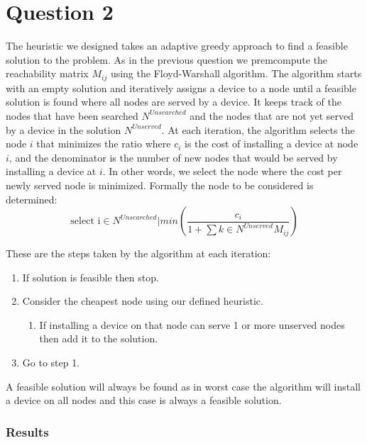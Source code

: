 \section{Question 2}

The heuristic we designed takes an adaptive greedy approach to find a feasible solution to the problem.
As in the previous question we premcompute the reachability matrix $M_{ij}$ using the Floyd-Warshall algorithm.
The algorithm starts with an empty solution and iteratively assigns a device to a node until a feasible solution is found where all nodes are served by a device.
It keeps track of the nodes that have been searched $N^{Unsearched}$ and the nodes that are not yet served by a device in the solution $N^{Unserved}$.
At each iteration, the algorithm selects the node $i$ that minimizes the ratio
where $c_i$ is the cost of installing a device at node $i$, and the denominator is the number of new nodes that would be served by installing a device at $i$. In other words, we select the node where the cost per newly served node is minimized.
Formally the node to be considered is determined: 
$$\text{select i} \in N^{Unsearched} | min(\frac{c_i}{1 + \sum{k \in N^{Unserved}}^{} M_{ij}})$$

These are the steps taken by the algorithm at each iteration:
\begin{enumerate}
	\item If solution is feasible then stop.
	\item Consider the cheapest node using our defined heuristic.
	\begin{enumerate}[label*=\arabic*.]
		\item If installing a device on that node can serve 1 or more unserved nodes then add it to the solution.
	\end{enumerate}
	\item Go to step 1.
\end{enumerate}

A feasible solution will always be found as in worst case the algorithm will install a device on all nodes and this case is always a feasible solution.

\newpage
\subsubsection*{Results}

